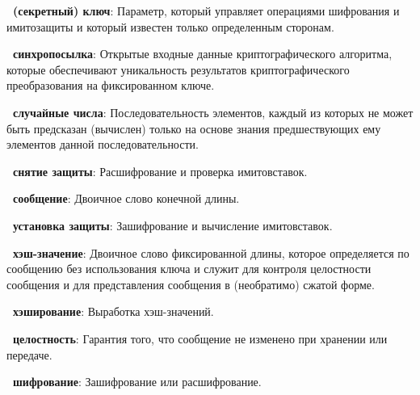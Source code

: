 {\bf \thedefctr~(секретный) ключ}:
Параметр, который управляет операциями шифрования 
и имитозащиты и который известен только определенным сторонам.

{\bf \thedefctr~синхропосылка}:
Открытые входные данные криптографического алгоритма,
которые обеспечивают уникальность результатов 
криптографического преобразования на фиксированном ключе.

{\bf \thedefctr~случайные числа}: 
Последовательность элементов, каждый из которых не может быть предсказан
(вычислен) только на основе знания предшествующих ему элементов данной
последовательности.

{\bf \thedefctr~снятие защиты}:
Расшифрование и проверка имитовставок.

{\bf \thedefctr~сообщение}:
Двоичное слово конечной длины.

{\bf \thedefctr~установка защиты}:
Зашифрование и вычисление имитовставок.

{\bf \thedefctr~хэш-значение}:
Двоичное слово фиксированной длины, 
которое определяется по сообщению без использования ключа и 
служит для контроля целостности сообщения и для представления 
сообщения в (необратимо) сжатой форме.

{\bf \thedefctr~хэширование}:
Выработка хэш-значений.

{\bf \thedefctr~целостность}:
Гарантия того, что сообщение не изменено 
при хранении или передаче.

{\bf \thedefctr~шифрование}:
Зашифрование или расшифрование.


